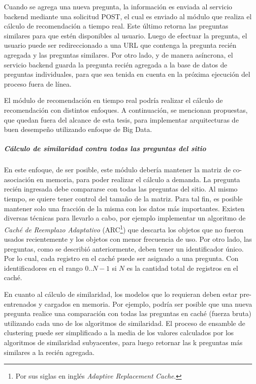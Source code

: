 \bigskip Cuando se agrega una nueva pregunta, la información es enviada al servicio backend mediante una solicitud POST, el cual es enviado al módulo que realiza el cálculo de recomendación a tiempo real. Este último retorna las preguntas similares para que estén disponibles al usuario. Luego de efectuar la pregunta, el usuario puede ser redireccionado a una URL que contenga la pregunta recién agregada y las preguntas similares. Por otro lado, y de manera asíncrona, el servicio backend guarda la pregunta recién agregada a la base de datos de preguntas individuales, para que sea tenida en cuenta en la próxima ejecución del proceso fuera de línea.

\bigskip El módulo de recomendación en tiempo real podría realizar el cálculo de recomendación con distintos enfoques. A continuación, se mencionan propuestas, que quedan fuera del alcance de esta tesis, para implementar arquitecturas de buen desempeño utilizando enfoque de Big Data.

\subparagraph{Cálculo de similaridad contra todas las preguntas del sitio}
En este enfoque, de ser posible, este módulo debería mantener la matriz de co-asociación en memoria, para poder realizar el cálculo a demanda. La pregunta recién ingresada debe compararse con todas las preguntas del sitio. Al mismo tiempo, se quiere tener control del tamaño de la matriz. Para tal fin, es posible mantener solo una fracción de la misma con los datos más importantes. Existen diversas técnicas para llevarlo a cabo, por ejemplo implementar un algoritmo de \textit{Caché de Reemplazo Adaptativo }(ARC\footnote{Por sus siglas en inglés \textit{Adaptive Replacement Cache}.}) que descarta los objetos que no fueron usados recientemente y los objetos con menor frecuencia de uso. Por otro lado, las preguntas, como se describió anteriormente, deben tener un identificador único. Por lo cual, cada registro en el caché puede ser asignado a una pregunta. Con identificadores en el rango \(0.. N-1\) si \(N\) es la cantidad total de registros en el caché.

\bigskip En cuanto al cálculo de similaridad, los modelos que lo requieran deben estar pre-entrenados y cargados en memoria. Por ejemplo, podría ser posible que una nueva pregunta realice una comparación con todas las preguntas en caché (fuerza bruta) utilizando cada uno de los algoritmos de similaridad. El proceso de ensamble de clustering puede ser simplificado a la media de los valores calculados por los algoritmos de similaridad subyacentes, para luego retornar las k preguntas más similares a la recién agregada.


